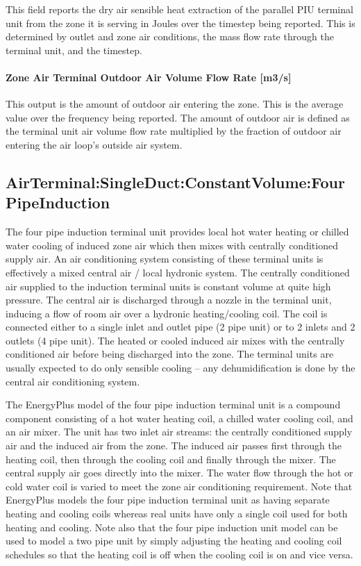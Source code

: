 This field reports the dry air sensible heat extraction of the parallel PIU terminal unit from the zone it is serving in Joules over the timestep being reported. This is determined by outlet and zone air conditions, the mass flow rate through the terminal unit, and the timestep.

\paragraph{Zone Air Terminal Outdoor Air Volume Flow Rate {[}m3/s{]}}

This output is the amount of outdoor air entering the zone. This is the average value over the frequency being reported. The amount of outdoor air is defined as the terminal unit air volume flow rate multiplied by the fraction of outdoor air entering the air loop's outside air system.

\subsection{AirTerminal:SingleDuct:ConstantVolume:FourPipeInduction}\label{airterminalsingleductconstantvolumefourpipeinduction}

The four pipe induction terminal unit provides local hot water heating or chilled water cooling of induced zone air which then mixes with centrally conditioned supply air. An air conditioning system consisting of these terminal units is effectively a mixed central air / local hydronic system. The centrally conditioned air supplied to the induction terminal units is constant volume at quite high pressure. The central air is discharged through a nozzle in the terminal unit, inducing a flow of room air over a hydronic heating/cooling coil. The coil is connected either to a single inlet and outlet pipe (2 pipe unit) or to 2 inlets and 2 outlets (4 pipe unit). The heated or cooled induced air mixes with the centrally conditioned air before being discharged into the zone. The terminal units are usually expected to do only sensible cooling -- any dehumidification is done by the central air conditioning system.

The EnergyPlus model of the four pipe induction terminal unit is a compound component consisting of a hot water heating coil, a chilled water cooling coil, and an air mixer. The unit has two inlet air streams: the centrally conditioned supply air and the induced air from the zone. The induced air passes first through the heating coil, then through the cooling coil and finally through the mixer. The central supply air goes directly into the mixer. The water flow through the hot or cold water coil is varied to meet the zone air conditioning requirement. Note that EnergyPlus models the four pipe induction terminal unit as having separate heating and cooling coils whereas real units have only a single coil used for both heating and cooling. Note also that the four pipe induction unit model can be used to model a two pipe unit by simply adjusting the heating and cooling coil schedules so that the heating coil is off when the cooling coil is on and vice versa.

